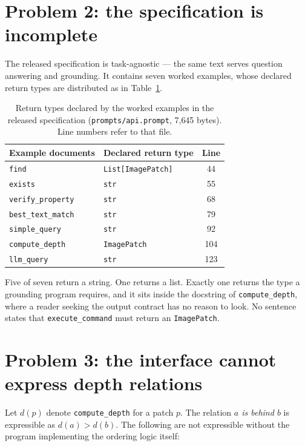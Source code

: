 \documentclass[12pt,a4paper,oneside]{report}
\begin{document}
\section{Problem 2: the specification is incomplete}

The released specification is task-agnostic --- the same text serves question
answering and grounding. It contains seven worked examples, whose declared return
types are distributed as in Table~\ref{tab:returntypes}.

\begin{table}[htbp]\centering
\caption{Return types declared by the worked examples in the released specification
(\texttt{prompts/api.prompt}, 7{,}645 bytes). Line numbers refer to that file.}
\label{tab:returntypes}
\begin{tabular}{@{}llc@{}}
\toprule
\textbf{Example documents} & \textbf{Declared return type} & \textbf{Line} \\
\midrule
\texttt{find}             & \texttt{List[ImagePatch]} & 44 \\
\texttt{exists}           & \texttt{str} & 55 \\
\texttt{verify\_property} & \texttt{str} & 68 \\
\texttt{best\_text\_match}& \texttt{str} & 79 \\
\texttt{simple\_query}    & \texttt{str} & 92 \\
\texttt{compute\_depth}   & \texttt{ImagePatch} & 104 \\
\texttt{llm\_query}       & \texttt{str} & 123 \\
\bottomrule
\end{tabular}
\end{table}

Five of seven return a string. One returns a list. Exactly one returns the type a
grounding program requires, and it sits inside the docstring of
\texttt{compute\_depth}, where a reader seeking the output contract has no reason to
look. No sentence states that \texttt{execute\_command} must return an
\texttt{ImagePatch}.

\section{Problem 3: the interface cannot express depth relations}

Let $d(p)$ denote \texttt{compute\_depth} for a patch $p$. The relation \emph{$a$ is
behind $b$} is expressible as $d(a) > d(b)$. The following are not expressible without
the program implementing the ordering logic itself:
\end{document}
